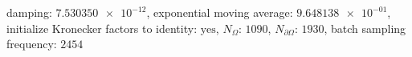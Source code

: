 damping: $\num[scientific-notation=true]{7.530350e-12}$, exponential moving average: $\num[scientific-notation=true]{9.648138e-01}$, initialize Kronecker factors to identity: $\text{yes}$, $N_{\Omega}$: $\num[scientific-notation=false]{1090}$, $N_{\partial\Omega}$: $\num[scientific-notation=false]{1930}$, batch sampling frequency: $\num[scientific-notation=false]{2454}$
